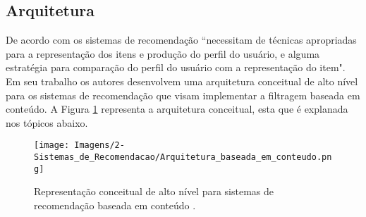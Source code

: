 \subsection{Arquitetura}
De acordo com  os sistemas de recomendação ``necessitam de técnicas apropriadas para a representação dos itens e produção do perfil do usuário, e alguma estratégia para comparação do perfil do usuário com a representação do item". Em seu trabalho os autores desenvolvem uma arquitetura conceitual de alto nível para os sistemas de recomendação que visam implementar a filtragem baseada em conteúdo. A Figura \ref{fig:framework_content_based} representa a arquitetura conceitual, esta que é explanada nos tópicos abaixo.

\begin{figure}[hbt!]
    \centering
    \texttt{[image: Imagens/2-Sistemas\_de\_Recomendacao/Arquitetura\_baseada\_em\_conteudo.png]}
    \caption{Representação conceitual de alto nível para sistemas de recomendação baseada em conteúdo \cite{Lops:2011}.}
    \label{fig:framework_content_based}
\end{figure}

